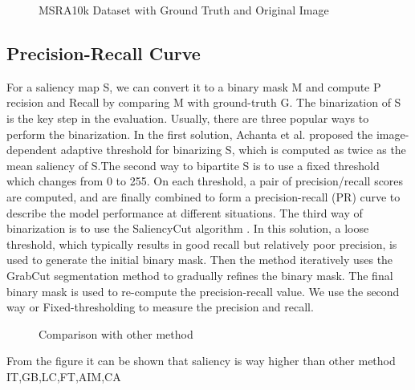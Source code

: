 \begin{figure}%
    \centering
    \caption{MSRA10k Dataset with Ground Truth and Original Image}%
    \label{fig:conversion23}%
\end{figure}


\subsection{Precision-Recall Curve}
For a saliency map S, we can
convert it to a binary mask M and compute P recision
and Recall by comparing M with ground-truth G.
The binarization
of S is the key step in the evaluation. Usually, there are
three popular ways to perform the binarization. In the first
solution, Achanta et al.\cite{achanta2010saliency} proposed the image-dependent
adaptive threshold for binarizing S, which is computed as
twice as the mean saliency of S.The second way to bipartite S is to use a fixed threshold
which changes from 0 to 255. On each threshold, a pair of precision/recall scores are computed, and are finally
combined to form a precision-recall (PR) curve to describe
the model performance at different situations.
The third way of binarization is to use the SaliencyCut
algorithm \cite{ren2014salient}. In this solution, a loose threshold, which
typically results in good recall but relatively poor precision,
is used to generate the initial binary mask. Then the method
iteratively uses the GrabCut segmentation method\cite{rother2004grabcut} to
gradually refines the binary mask. The final binary mask is
used to re-compute the precision-recall value.
We use the second way or Fixed-thresholding to measure the precision and recall.

\begin{figure}[here]%
    \centering
    \caption{Comparison with other method}%
    \label{fig:conversion23}%
\end{figure}
\noindent
From the figure it can be shown that saliency is way higher than other method IT\cite{itti1998model},GB\cite{harel2007graph},LC\cite{zhai2006visual},FT\cite{achanta2009frequency},AIM\cite{bruce2009saliency},CA\cite{goferman2012context}


